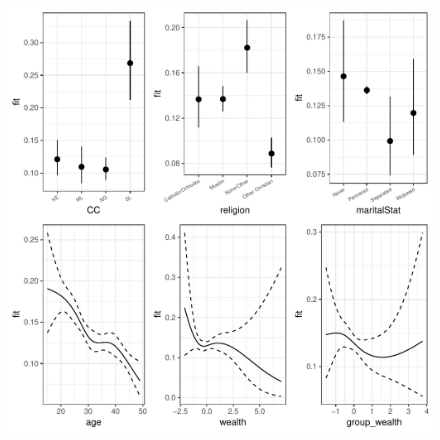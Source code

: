 \documentclass[12pt,]{article}
\begin{document}
\begin{center}
\begin{figure}[h!]
\includegraphics[scale=0.7,page=2]{./git_push/hybrid_isoplots.Rout.pdf}
\end{figure}
\end{center}

\FloatBarrier


\end{document}
